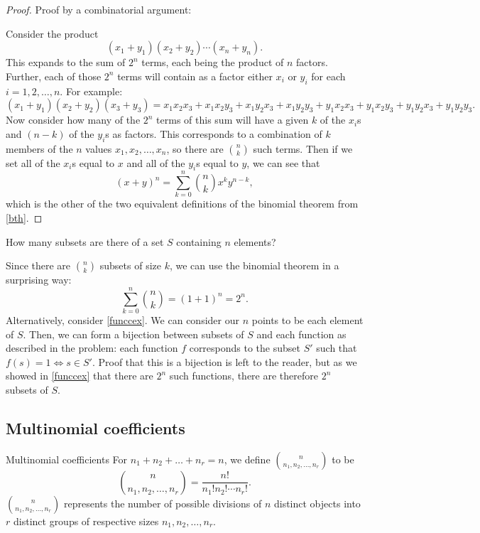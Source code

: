\begin{proof}
    Proof by a combinatorial argument:
    
    \vspace{5pt}
    
    \noindent Consider the product \[
        (x_1 + y_1)(x_2 + y_2)\cdots(x_n + y_n).    
    \] This expands to the sum of $2^n$ terms, each being the product of $n$ factors. Further, each of those $2^n$ terms will contain as a factor either $x_i$ or $y_i$ for each $i = 1, 2, \dots, n$. For example: \[
        (x_1 + y_1)(x_2 + y_2)(x_3 + y_3) = x_1x_2x_3 + x_1x_2y_3 + x_1y_2x_3 +x_1y_2y_3 + y_1x_2x_3 + y_1x_2y_3 + y_1y_2x_3 + y_1y_2y_3.    
    \] Now consider how many of the $2^n$ terms of this sum will have a given $k$ of the $x_i$s and $(n - k)$ of the $y_i$s as factors. This corresponds to a combination of $k$ members of the $n$ values $x_1, x_2, \dots, x_n$, so there are $\binom{n}{k}$ such terms. Then if we set all of the $x_i$s equal to $x$ and all of the $y_i$s equal to $y$, we can see that \[
        (x+y)^n = \sum^n_{k=0}\binom{n}{k}x^ky^{n-k},   
    \] which is the other of the two equivalent definitions of the binomial theorem from \autoref{bth}.
\end{proof}

\begin{changebar}
    \begin{example}
        How many subsets are there of a set $S$ containing $n$ elements?
    \end{example}
    \begin{solution}
        Since there are $\binom{n}{k}$ subsets of size $k$, we can use the binomial theorem in a surprising way: \[
            \sum^n_{k=0}\binom{n}{k} = (1 + 1)^n = 2^n.
            \]
            Alternatively, consider \autoref{funccex}. We can consider our $n$ points to be each element of $S$. Then, we can form a bijection between subsets of $S$ and each function as described in the problem: each function $f$ corresponds to the subset $S'$ such that $f(s) = 1 \iff s \in S'$. Proof that this is a bijection is left to the reader, but as we showed in \autoref{funccex} that there are $2^n$ such functions, there are therefore $2^n$ subsets of $S$.
        \end{solution}
    \end{changebar}

\pagebreak
\subsection{Multinomial coefficients}
\begin{bdef}{Multinomial coefficients}
    For $n_1 + n_2 + \dots + n_r = n$, we define $\displaystyle \binom{n}{n_1,n_2,\dots,n_r}$ to be \[
        \binom{n}{n_1,n_2,\dots,n_r} = \frac{n!}{n_1!n_2!\cdots n_r!}.
    \] $\binom{n}{n_1, n_2, \dots, n_r}$ represents the number of possible divisions of $n$ distinct objects into $r$ distinct groups of respective sizes $n_1, n_2, \dots, n_r$.
\end{bdef}

